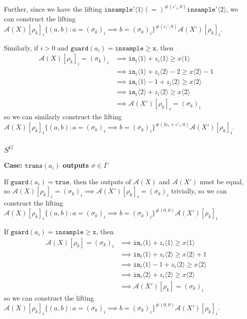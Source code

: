 \documentclass[12pt]{article}
\newcommand{\gguard}[1][x]{\texttt{insample}\geq \texttt{#1}}
\newcommand{\brangle}[1]{\langle #1 \rangle}
\newcommand{\guard}{\texttt{guard}}
\newcommand{\trans}{\texttt{trans}}
\theoremstyle{definition}
\begin{document}
Further, since we have the lifting $\texttt{insample}'\brangle{1} (=)^{\#(\varepsilon'_i, 0)} \texttt{insample}'\brangle{2}$, we can construct the lifting $\mathcal{A}(X)[\rho_k]_i\{(a, b): a = (\sigma_k)_i \implies b = (\sigma_k)_i\}^{\#(\varepsilon_i', 0)}\mathcal{A}(X')[\rho_k]_i$.

Similarly, if $i>0$ and $\guard(a_i) = \gguard$, then \begin{align*}
	\mathcal{A}(X)[\rho_k]_i = (\sigma_k)_i&\implies \texttt{in}_i\langle 1 \rangle + z_i\langle 1 \rangle \geq x\langle 1 \rangle\\
	&\implies \texttt{in}_i\langle 1\rangle + z_i\langle 2 \rangle -2 \geq x\langle 2 \rangle-1\\
	&\implies\texttt{in}_i\langle 1 \rangle -1 + z_i\langle 2 \rangle \geq x\langle 2 \rangle\\
	&\implies\texttt{in}_i\langle 2 \rangle + z_i\langle 2 \rangle \geq x\langle 2 \rangle\\
	&\implies \mathcal{A}(X')[\rho_k]_i = (\sigma_k)_i
\end{align*}
so we can similarly construct the lifting $\mathcal{A}(X)[\rho_k]_i\{(a, b): a = (\sigma_k)_i \implies b = (\sigma_k)_i\}^{\#(2\varepsilon_i+\varepsilon'_i, 0)}\mathcal{A}(X')[\rho_k]_i$.

\subsubsection{$S^G$}

\textbf{Case: $\trans(a_i)$ outputs $\sigma \in \Gamma$}

If $\guard(a_i) = \texttt{true}$, then the outputs of $\mathcal{A}(X)$ and $\mathcal{A}(X')$ must be equal, so $\mathcal{A}(X)[\rho_k]_i = (\sigma_k)_i \implies \mathcal{A}(X')[\rho_k]_i = (\sigma_k)_i$ trivially, so we can construct the lifting $\mathcal{A}(X)[\rho_k]_i\{(a, b): a = (\sigma_k)_i \implies b = (\sigma_k)_i\}^{\#(0, 0)}\mathcal{A}(X')[\rho_k]_i$

If $\guard(a_i) = \gguard$, then \begin{align*}
	\mathcal{A}(X)[\rho_k] = (\sigma_k)_i&\implies \texttt{in}_i\langle 1 \rangle + z_i\langle 1 \rangle \geq x\langle 1 \rangle\\
	&\implies \texttt{in}_i\langle 1\rangle + z_i\langle 2 \rangle \geq x\langle 2 \rangle+1\\
	&\implies\texttt{in}_i\langle 1 \rangle -1 + z_i\langle 2 \rangle \geq x\langle 2 \rangle\\
	&\implies\texttt{in}_i\langle 2 \rangle + z_i\langle 2 \rangle \geq x\langle 2 \rangle\\
	&\implies \mathcal{A}(X')[\rho_k] = (\sigma_k)_i
\end{align*}
so we can construct the lifting $\mathcal{A}(X)[\rho_k]_i\{(a, b): a = (\sigma_k)_i \implies b = (\sigma_k)_i\}^{\#(0, 0)}\mathcal{A}(X')[\rho_k]_i$.
\end{document}
